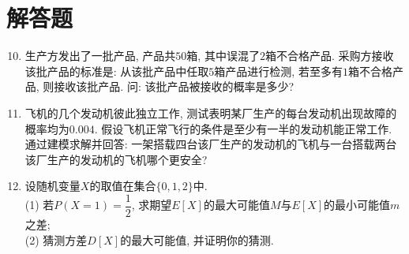 \documentclass[10pt,a4paper]{article}
\begin{document}
\section{解答题}

\begin{enumerate}[1.]
\setcounter{enumi}{9}
\item 生产方发出了一批产品, 产品共$50$箱, 其中误混了$2$箱不合格产品. 采购方接收该批产品的标准是: 从该批产品中任取$5$箱产品进行检测, 若至多有$1$箱不合格产品, 则接收该批产品. 问: 该批产品被接收的概率是多少? 

\newpage

\item 飞机的几个发动机彼此独立工作, 测试表明某厂生产的每台发动机出现故障的概率均为$0.004$. 假设飞机正常飞行的条件是至少有一半的发动机能正常工作. 通过建模求解并回答: 一架搭载四台该厂生产的发动机的飞机与一台搭载两台该厂生产的发动机的飞机哪个更安全?

\vspace*{8cm}

\item 设随机变量$X$的取值在集合$\{0,1,2\}$中.\\
(1) 若$P(X=1)=\dfrac 12$, 求期望$E[X]$的最大可能值$M$与$E[X]$的最小可能值$m$之差;\\
(2) 猜测方差$D[X]$的最大可能值, 并证明你的猜测.
\end{enumerate}
\end{document}
